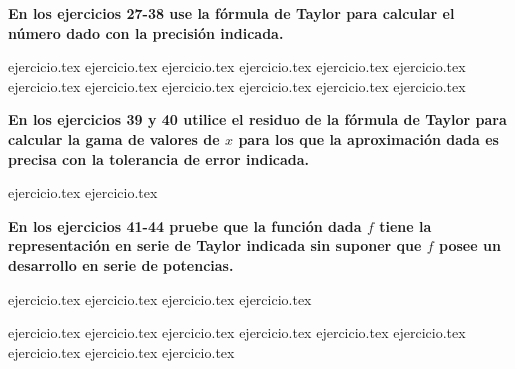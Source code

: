 \vspace{0.3cm}
\noindent\textbf{En los ejercicios 27-38 use la fórmula de Taylor para calcular el número dado con la precisión indicada.}
\begin{enumerate}
    \setcounter{enumi}{26}
    {ejercicio.tex}
{ejercicio.tex}
{ejercicio.tex}
{ejercicio.tex}
{ejercicio.tex}
{ejercicio.tex}
{ejercicio.tex}
{ejercicio.tex}
{ejercicio.tex}
{ejercicio.tex}
{ejercicio.tex}
{ejercicio.tex}
\end{enumerate}

\vspace{0.3cm}
\noindent\textbf{En los ejercicios 39 y 40 utilice el residuo de la fórmula de Taylor para calcular la gama de valores de $x$ para los que la aproximación dada es precisa con la tolerancia de error indicada.}
\begin{enumerate}
    \setcounter{enumi}{38}
    {ejercicio.tex}
{ejercicio.tex}
\end{enumerate}

\vspace{0.3cm}
\noindent\textbf{En los ejercicios 41-44 pruebe que la función dada $f$ tiene la representación en serie de Taylor indicada sin suponer que $f$ posee un desarrollo en serie de potencias.}
\begin{enumerate}
    \setcounter{enumi}{40}
    {ejercicio.tex}
{ejercicio.tex}
{ejercicio.tex}
{ejercicio.tex}
\end{enumerate}

\vspace{0.3cm}
\begin{enumerate}
    \setcounter{enumi}{44}
    {ejercicio.tex}
{ejercicio.tex}
{ejercicio.tex}
{ejercicio.tex}
{ejercicio.tex}
{ejercicio.tex}
{ejercicio.tex}
{ejercicio.tex}
{ejercicio.tex}
\end{enumerate}
